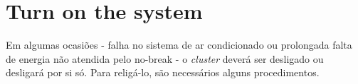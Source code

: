 \chapter{Turn on the system}
\label{chap:turn-on}

Em algumas ocasiões - falha no sistema de ar condicionado ou prolongada falta de energia não atendida pelo no-break - o \textit{cluster} deverá ser desligado ou desligará por si só. Para religá-lo, são necessários alguns procedimentos.

